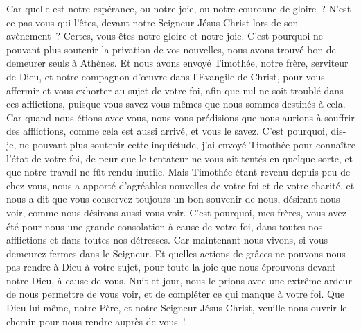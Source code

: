 \begin{multicols}{2}
Car quelle est notre espérance, ou notre joie, ou notre couronne de gloire~? N'est-ce pas vous qui l'êtes, devant notre Seigneur Jésus-Christ lors de son avènement~?
Certes, vous êtes notre gloire et notre joie.
\VerseOne{}C'est pourquoi ne pouvant plus soutenir la privation de vos nouvelles, nous avons trouvé bon de demeurer seuls à Athènes.
Et nous avons envoyé Timothée, notre frère, serviteur de Dieu, et notre compagnon d'œuvre dans l'Evangile de Christ, pour vous affermir et vous exhorter au sujet de votre foi,
afin que nul ne soit troublé dans ces afflictions, puisque vous savez vous-mêmes que nous sommes destinés à cela.
Car quand nous étions avec vous, nous vous prédisions que nous aurions à souffrir des afflictions, comme cela est aussi arrivé, et vous le savez.
C'est pourquoi, dis-je, ne pouvant plus soutenir cette inquiétude, j'ai envoyé Timothée pour connaître l'état de votre foi, de peur que le tentateur ne vous ait tentés en quelque sorte, et que notre travail ne fût rendu inutile.
Mais Timothée étant revenu depuis peu de chez vous, nous a apporté d'agréables nouvelles de votre foi et de votre charité, et nous a dit que vous conservez toujours un bon souvenir de nous, désirant nous voir, comme nous désirons aussi vous voir.
C'est pourquoi, mes frères, vous avez été pour nous une grande consolation à cause de votre foi, dans toutes nos afflictions et dans toutes nos détresses.
Car maintenant nous vivons, si vous demeurez fermes dans le Seigneur.
Et quelles actions de grâces ne pouvons-nous pas rendre à Dieu à votre sujet, pour toute la joie que nous éprouvons devant notre Dieu, à cause de vous.
Nuit et jour, nous le prions avec une extrême ardeur de nous permettre de vous voir, et de compléter ce qui manque à votre foi.
Que Dieu lui-même, notre Père, et notre Seigneur Jésus-Christ, veuille nous ouvrir le chemin pour nous rendre auprès de vous~!

\end{multicols}
